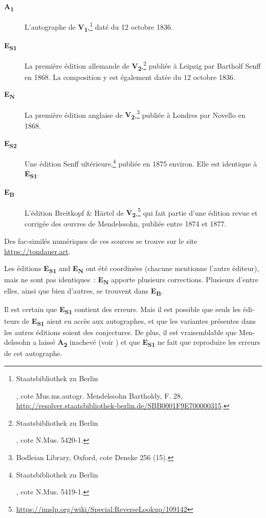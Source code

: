 \documentclass[a4paper, 12pt]{book}
\newcommand{\source}[2]{\textbf{#1\textsubscript{#2}}}
\begin{document}
{\begin{otherlanguage}{french}
    \begin{description}
    \item[\source{A}{1}] L'autographe de
      \source{V}{1},\footnote{\begin{otherlanguage}{ngerman}Staatsbibliothek
          zu Berlin\end{otherlanguage}, cote
          Mus.ms.autogr. Mendelssohn Bartholdy, F. 28,
          \url{http://resolver.staatsbibliothek-berlin.de/SBB0001F9E700000315}.}
      daté du 12 octobre 1836.
    \item[\source{E}{S1}] La première édition allemande de
      \source{V}{2},\footnote{\begin{otherlanguage}{ngerman}Staatsbibliothek
          zu Berlin\end{otherlanguage}, \foreignlanguage{french}{cote} N.Mus. 5420-1.}
      publiée à Leipzig par Bartholf Senff en 1868. La composition y est également
      datée du 12 octobre 1836.
    \item[\source{E}{N}] La première édition anglaise de
      \source{V}{2},\footnote{Bodleian Library, Oxford, \foreignlanguage{french}{cote}
        Deneke 256 (15).} publiée à Londres par Novello en 1868.
    \item[\source{E}{S2}] Une édition Senff
      ultérieure,\footnote{\begin{otherlanguage}{ngerman}Staatsbibliothek
      zu Berlin\end{otherlanguage}, \foreignlanguage{french}{cote} N.Mus. 5419-1.}
      publiée en 1875 environ. Elle est identique à \source{E}{S1}.
    \item[\source{E}{B}] L'édition Breitkopf \& Härtel de
      \source{V}{2},\footnote{\url{https://imslp.org/wiki/Special:ReverseLookup/109142}}
      qui fait partie d'une édition revue et corrigée des \oe uvres de Mendelssohn,
      publiée entre 1874 et 1877.
    \end{description}

    Des fac-similés numériques de ces sources se trouve sur le site
    \url{https://tondauer.art}.

    Les éditions \source{E}{S1} and \source{E}{N} ont été coordinées
    (chacune mentionne l'autre éditeur), mais ne sont pas identiques~:
    \source{E}{N} apporte plusieurs corrections. Plusieurs d'entre
    elles, ainsi que bien d'autres, se trouvent dans \source{E}{B}.

    Il est certain que \source{E}{S1} contient des erreurs. Mais il
    est possible que seuls les éditeurs de \source{E}{S1} aient eu
    accès aux autographes, et que les variantes présentes dans les
    autres éditions soient des conjectures. De plus, il est
    vraisemblable que Mendelssohn a laissé \source{A}{2} inachevé
    (voir ) et que \source{E}{S1} ne fait que
    reproduire les erreurs de cet autographe.


\end{otherlanguage}}
\end{document}
